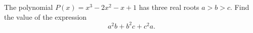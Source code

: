 The polynomial $P(x)=x^3-2x^2-x+1$ has three real roots $a>b>c$.
Find the value of the expression
$$a^2b+b^2c+c^2a.$$